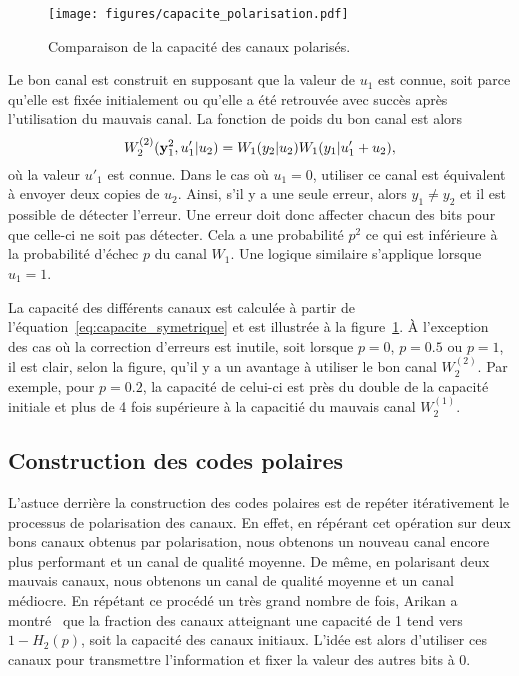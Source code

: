 \begin{figure}
  \begin{center}
    \texttt{[image: figures/capacite\_polarisation.pdf]}
  \end{center}
  \caption[Capacité des canaux polarisés]{Comparaison de la capacité des canaux polarisés.}
  \label{fig:capacite_polarisation}
\end{figure}

Le bon canal est construit en supposant que la valeur de $u_1$ est connue,
soit parce qu'elle est fixée initialement ou qu'elle a été retrouvée avec succès
après l'utilisation du mauvais canal.
La fonction de poids du bon canal est alors
\begin{equation}
  W_2^{(2)}(\vb y_1^2, u'_1 | u_2) 
  = W_1(y_2 | u_2) W_1(y_1 | u'_1 + u_2),
\end{equation}
où la valeur $u'_1$ est connue. 
Dans le cas où $u_1 = 0$, 
utiliser ce canal est équivalent à envoyer deux copies de $u_2$. 
Ainsi, 
s'il y a une seule erreur, alors $y_1 \neq y_2$ et il est possible de détecter l'erreur.
Une erreur doit donc affecter chacun des bits pour que celle-ci ne soit pas détecter.
Cela a une probabilité $p^2$ ce qui est inférieure à la probabilité d'échec $p$ du canal $W_1$.
Une logique similaire s'applique lorsque $u_1 = 1$.

La capacité des différents canaux est calculée à partir 
de l'équation~\eqref{eq:capacite_symetrique}
et est illustrée à la figure~\ref{fig:capacite_polarisation}.
À l'exception des cas où la correction d'erreurs est inutile,
soit lorsque $p = 0$, $p =0.5$ ou $p = 1$,
il est clair, selon la figure, qu'il y a un avantage à utiliser le bon canal $W_2^{(2)}$.
Par exemple, pour $p = 0.2$, la capacité de celui-ci est près du double 
de la capacité initiale et plus de 4 fois supérieure à la capacitié du mauvais canal $W_2^{(1)}$.

\subsection{Construction des codes polaires}

L'astuce derrière la construction des codes polaires est de repéter itérativement le 
processus de polarisation des canaux.
En effet, 
en répérant cet opération sur deux bons canaux obtenus par polarisation,
nous obtenons un nouveau canal encore plus performant et un canal de qualité moyenne.
De même,
en polarisant deux mauvais canaux, nous obtenons un canal de qualité moyenne et 
un canal médiocre.
En répétant ce procédé un très grand nombre de fois,
Arikan a montré~\cite{arikan_channel_2009} 
que la fraction des canaux atteignant une capacité de 1
tend vers $1 - H_2(p)$, soit la capacité des canaux initiaux.
L'idée est alors d'utiliser ces canaux pour transmettre l'information
et fixer la valeur des autres bits à 0.

